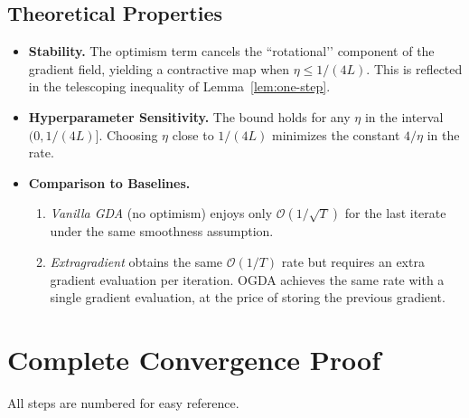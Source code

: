 \documentclass{article}
\begin{document}
\subsection*{Theoretical Properties}
\begin{itemize}[leftmargin=*]
\item \textbf{Stability.} The optimism term cancels the “rotational’’ component of the gradient field, yielding a contractive map when $\eta\le 1/(4L)$. This is reflected in the telescoping inequality of Lemma~\ref{lem:one-step}.
\item \textbf{Hyperparameter Sensitivity.} The bound holds for any $\eta$ in the interval $(0,1/(4L)]$. Choosing $\eta$ close to $1/(4L)$ minimizes the constant $4/\eta$ in the rate.
\item \textbf{Comparison to Baselines.}
\begin{enumerate}
\item \emph{Vanilla GDA} (no optimism) enjoys only $\mathcal{O}(1/\sqrt{T})$ for the last iterate under the same smoothness assumption.
\item \emph{Extragradient} obtains the same $\mathcal{O}(1/T)$ rate but requires an extra gradient evaluation per iteration. OGDA achieves the same rate with a single gradient evaluation, at the price of storing the previous gradient.
\end{enumerate}
\end{itemize}

\section*{Complete Convergence Proof}
All steps are numbered for easy reference.
\end{document}
